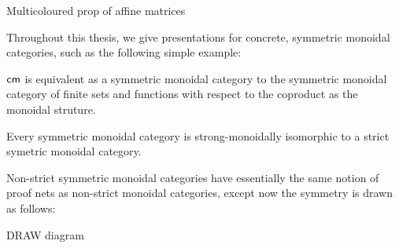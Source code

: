 \begin{example}
Multicoloured prop of affine matrices
\end{example}





Throughout this thesis, we give presentations for concrete, symmetric monoidal categories, such as the following simple example:

\begin{lemma}
${\sf cm}$ is equivalent as a symmetric monoidal category to the symmetric monoidal category of finite sets and functions with respect to the coproduct as the monoidal struture.
\end{lemma}
%
%


\begin{theorem}
Every symmetric monoidal category is strong-monoidally isomorphic to a strict symetric monoidal category. 
\end{theorem}

Non-strict symmetric monoidal categories have essentially the same notion of proof nets as non-strict monoidal categories, except now the symmetry is drawn as follows:

DRAW diagram

